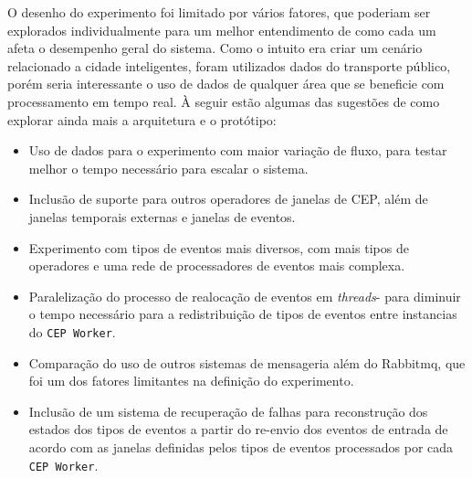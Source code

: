 O desenho do experimento foi limitado por vários fatores, que poderiam ser explorados individualmente para um melhor entendimento de como cada um afeta o desempenho geral do sistema. Como o intuito era criar um cenário relacionado a cidade inteligentes, foram utilizados dados do transporte público, porém seria interessante o uso de dados de qualquer área que se beneficie com processamento em tempo real. À seguir estão algumas das sugestões de como explorar ainda mais a arquitetura e o protótipo:

\begin{itemize}
    \item Uso de dados para o experimento com maior variação de fluxo, para testar melhor o tempo necessário para escalar o sistema.
    \item Inclusão de suporte para outros operadores de janelas de CEP, além de janelas temporais externas e janelas de eventos. 
    \item Experimento com tipos de eventos mais diversos, com mais tipos de operadores e uma rede de processadores de eventos mais complexa.
    \item Paralelização do processo de realocação de eventos em \textit{threads}- para diminuir o tempo necessário para a redistribuição de tipos de eventos entre instancias do \texttt{CEP Worker}.
    \item Comparação do uso de outros sistemas de mensageria além do Rabbitmq, que foi um dos fatores limitantes na definição do experimento.
    \item Inclusão de um sistema de recuperação de falhas para reconstrução dos estados dos tipos de eventos a partir do re-envio dos eventos de entrada de acordo com as janelas definidas pelos tipos de eventos processados por cada \texttt{CEP Worker}.
\end{itemize}